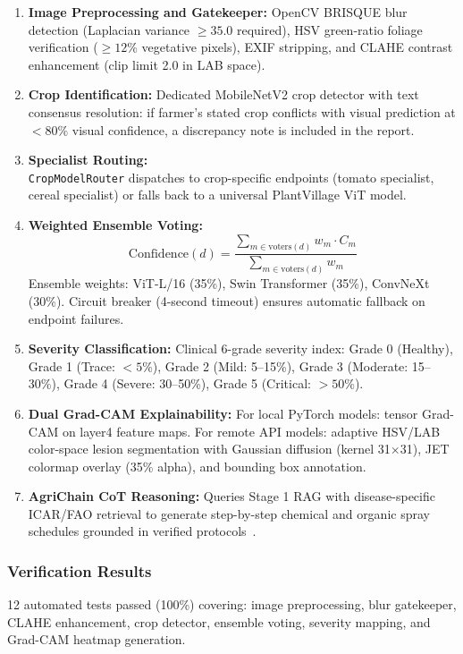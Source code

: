 \documentclass[12pt,a4paper]{article}
\begin{document}
\begin{enumerate}
\item \textbf{Image Preprocessing and Gatekeeper:} OpenCV BRISQUE blur detection (Laplacian variance $\geq 35.0$ required), HSV green-ratio foliage verification ($\geq 12\%$ vegetative pixels), EXIF stripping, and CLAHE contrast enhancement (clip limit 2.0 in LAB space).

\item \textbf{Crop Identification:} Dedicated MobileNetV2 crop detector with text consensus resolution: if farmer's stated crop conflicts with visual prediction at $< 80\%$ visual confidence, a discrepancy note is included in the report.

\item \textbf{Specialist Routing:}\\ \texttt{CropModelRouter} dispatches to crop-specific endpoints (tomato specialist, cereal specialist) or falls back to a universal PlantVillage ViT model.

\item \textbf{Weighted Ensemble Voting:}
\begin{equation}
\text{Confidence}(d) = \frac{\sum_{m \in \text{voters}(d)} w_m \cdot C_m}{\sum_{m \in \text{voters}(d)} w_m}
\end{equation}
Ensemble weights: ViT-L/16 (35\%), Swin Transformer (35\%), ConvNeXt (30\%). Circuit breaker (4-second timeout) ensures automatic fallback on endpoint failures.

\item \textbf{Severity Classification:} Clinical 6-grade severity index: Grade 0 (Healthy), Grade 1 (Trace: $<5\%$), Grade 2 (Mild: 5--15\%), Grade 3 (Moderate: 15--30\%), Grade 4 (Severe: 30--50\%), Grade 5 (Critical: $>50\%$).

\item \textbf{Dual Grad-CAM Explainability:} For local PyTorch models: tensor Grad-CAM on layer4 feature maps. For remote API models: adaptive HSV/LAB color-space lesion segmentation with Gaussian diffusion (kernel 31$\times$31), JET colormap overlay (35\% alpha), and bounding box annotation.

\item \textbf{AgriChain CoT Reasoning:} Queries Stage 1 RAG with disease-specific ICAR/FAO retrieval to generate step-by-step chemical and organic spray schedules grounded in verified protocols~\cite{agrichain2025}.
\end{enumerate}

\subsubsection{Verification Results}
12 automated tests passed (100\%) covering: image preprocessing, blur gatekeeper, CLAHE enhancement, crop detector, ensemble voting, severity mapping, and Grad-CAM heatmap generation.
\end{document}
